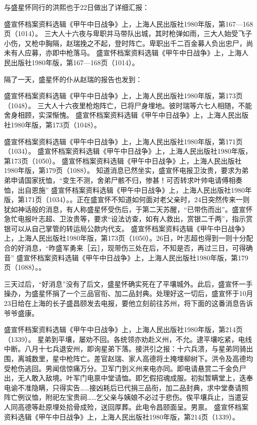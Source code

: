 \documentclass[12pt,UTF8]{ctexbook}
\begin{document}
与盛星怀同行的洪熙也于22日做出了详细汇报：

盛宣怀档案资料选辑《甲午中日战争》上，上海人民出版社1980年版，第167—168页（1014）。
三大人十六夜与卑职并马带队出城，其时枪弹如雨，三大人始受飞子小伤，又枪中胸隔，赵瑞挽之不起，登时阵亡。卑职出千二百金募人负出忠尸，尚未有人应募，亦即中枪落马。 盛宣怀档案资料选辑《甲午中日战争》上，上海人民出版社1980年版，第167—168页（1014）。

隔了一天，盛星怀的仆从赵瑞的报告也发到：

盛宣怀档案资料选辑《甲午中日战争》上，上海人民出版社1980年版，第173页（1048）。
三大人十六夜里枪炮阵亡，已将尸身埋地。彼时瑞等六七人相随，不能舍身相顾，实深惭愧。 盛宣怀档案资料选辑《甲午中日战争》上，上海人民出版社1980年版，第173页（1048）。

盛宣怀档案资料选辑《甲午中日战争》上，上海人民出版社1980年版，第171页（1034）。
盛宣怀档案资料选辑《甲午中日战争》上，上海人民出版社1980年版，第173页（1050）。
盛宣怀档案资料选辑《甲午中日战争》上，上海人民出版社1980年版，第179页（1088）。
知道消息已然坐实，盛宣怀电报卫汝贵，要求为弟弟申请国家抚恤，“变生不测，舍弟尸骸不归，惨甚！可否转求叶帅电请傅相奏恤，出自恩施” 盛宣怀档案资料选辑《甲午中日战争》上，上海人民出版社1980年版，第171页（1034）。。正在盛宣怀不知道如何面对老父亲时，24日突然传来一则犹如神话般的消息，有人称盛星怀受伤后，于第二天苏醒，“已带伤而出”。盛宣怀急忙电报叶志超、卫汝贵等，要求“设法访查，如有人救出，赏银二千两”，指示赏银可以从自己掌管的转运局公款内代支。 盛宣怀档案资料选辑《甲午中日战争》上，上海人民出版社1980年版，第173页（1050）。26日，叶志超也得到一则十分配合的好消息，“昨盛军勇来［云］，现带伤三处在后，不知是否，再过三日，可得确音” 盛宣怀档案资料选辑《甲午中日战争》上，上海人民出版社1980年版，第179页（1088）。。

三天过后，“好消息”没有了后文，盛星怀确实死在了平壤城外。此后，盛宣怀一手操办，为盛星怀捐了一个三品官衔、加二品封典。处理好这一切后，盛宣怀于10月23日给在上海的长子盛昌颐发去电报，要他立刻前往苏州，将下面的这番消息告诉爷爷盛康。

盛宣怀档案资料选辑《甲午中日战争》上，上海人民出版社1980年版，第214页（1339）。
星弟到平壤，屡劝不回。各统领亦劝赴义州，不允。逮平壤吃紧，电线中断。八月十七兵退安州，即询星弟下落。接洪引之报：十六兵溃，与星弟同骑出围，离城数里，星中枪阵亡。差官赵瑞、家人高德将土掩埋柳树下。洪令及高德均受枪伤逃回。男闻信惊痛万分。卫军门到义州来电亦同。即电请悬赏二千金负尸出，无人敢入敌境。叶军门电禀中堂请恤。即乞假招魂成服。初拟暂瞒堂上，迭奉电谕不准隐瞒，只得实告……接凶耗后已代捐三品衔，加二品封典，求中堂奏请照阵亡例议恤，附祀左宝贵祠……乞父亲与姨娘不必过于悲伤。俟平壤兵止，当遣妥人同高德等赴原埋处拾骨成殓，送回厚葬。此电令昌颐面呈。男禀。 盛宣怀档案资料选辑《甲午中日战争》上，上海人民出版社1980年版，第214页（1339）。
\end{document}
